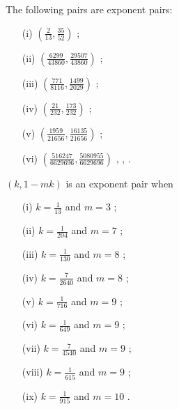\begin{theorem}  The following pairs are exponent pairs:
\begin{itemize}
\item[(i)] $(\frac{2}{13}, \frac{35}{52})$ \cite{huxley_watt_exponential_1990};
\item[(ii)] $(\frac{6299}{43860}, \frac{29507}{43860})$ \cite[Table 17.3]{huxley_area_1996};
\item[(iii)] $(\frac{771}{8116}, \frac{1499}{2029})$ \cite[p. 285]{sargos_points_1995};
\item[(iv)] $(\frac{21}{232}, \frac{173}{232})$ \cite[p. 286]{sargos_points_1995};
\item[(v)] $(\frac{1959}{21656}, \frac{16135}{21656})$ \cite[p. 286]{sargos_points_1995};
\item[(vi)] $(\frac{516247}{6629696}, \frac{5080955}{6629696})$ \cite{huxley_exponential_2001}, \cite[Table 19.2]{huxley_area_1996}, \cite{robert_fourth_2002}.
\end{itemize}
\end{theorem}

\literature
{}

\begin{theorem} $(k,1-mk)$ is an exponent pair when
    \begin{itemize}
\item[(i)] $k=\frac{1}{13}$ and $m=3$ \cite[Theorem 1]{robert_fourth_2002};
\item[(ii)] $k = \frac{1}{204}$ and $m=7$ \cite[p. 231]{sargos_analog_2003};
\item[(iii)] $k = \frac{1}{130}$ and $m=8$ \cite[(1.1)]{robert_2002};
\item[(iv)] $k = \frac{7}{2640}$ and $m=8$ \cite[p. 231]{sargos_analog_2003};
\item[(v)] $k = \frac{1}{716}$ and $m=9$ \cite[p. 231]{sargos_analog_2003};
\item[(vi)] $k = \frac{1}{649}$ and $m=9$ \cite{Robert_Sargos_2001};
\item[(vii)] $k = \frac{7}{4540}$ and $m=9$ \cite[(1.2)]{robert_2002};
\item[(viii)] $k = \frac{1}{615}$ and $m=9$ \cite[(1.1)]{robert_2002};
\item[(ix)] $k = \frac{1}{915}$ and $m=10$ \cite[Th\'eor\`eme 2]{robert_2002b}.
\end{itemize}
\end{theorem}

